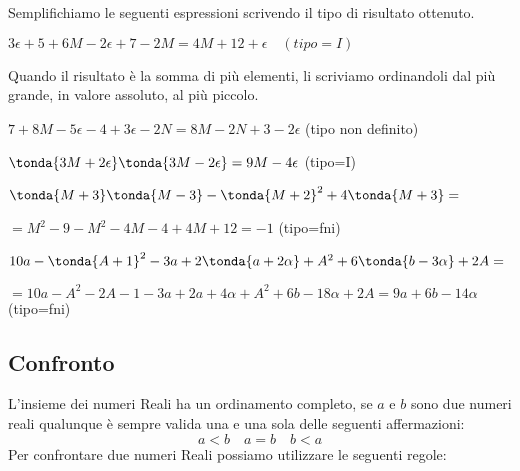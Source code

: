 \begin{exrig}
Semplifichiamo le seguenti espressioni scrivendo il tipo di risultato 
ottenuto.

 \begin{esempio}
  \(3\epsilon +5 +6M -2\epsilon +7 -2M = 4M +12 +\epsilon \quad (tipo=I)\)
 \end{esempio}

\begin{osservazione}
Quando il risultato è la somma di più elementi, li scriviamo ordinandoli 
dal più grande, in valore assoluto, al più piccolo.
\end{osservazione}

 \begin{esempio}
\(7 +8M -5\epsilon  -4 +3\epsilon-2N = 8M -2N +3 -2\epsilon\)
\quad (tipo non definito)
 \end{esempio}
 
 \begin{esempio}
\(\tonda{3M +2\epsilon} \tonda{3M -2\epsilon} = 9M -4\epsilon\)
\quad (tipo=I)
 \end{esempio}
 
 \begin{esempio}
\(\tonda{M +3} \tonda{M -3} - \tonda{M+2}^2 +4\tonda{M +3}=\)

\(=M^2 -9 -M^2 -4M -4 +4M +12 = -1\)
\quad (tipo=fni)
 \end{esempio}
 
 \begin{esempio}
\(10a -\tonda{A +1}^2 -3a +2\tonda{a+2\alpha} +A^2 +6\tonda{b -3\alpha} 
+2A= 
\)

\(=10a -A^2 -2A -1 -3a +2a+4\alpha +A^2 +6b -18\alpha +2A = 9a +6b 
-14\alpha\) 
\quad (tipo=fni)
 \end{esempio}
\end{exrig}


\subsection{Confronto}
\label{subsec:insnum_confronto}

L'insieme dei numeri Reali ha un ordinamento completo, se \(a\) e \(b\) sono 
due numeri reali qualunque è sempre valida una e una sola delle seguenti 
affermazioni:
\[a<b \quad a=b \quad b<a\]
Per confrontare due numeri Reali possiamo utilizzare le seguenti regole:

